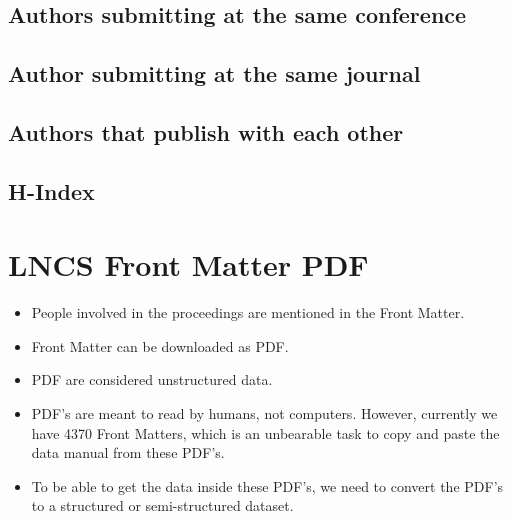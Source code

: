 \documentclass{ou-report}
\begin{document}
\section{Authors submitting at the same conference}

\section{Author submitting at the same journal}

\section{Authors that publish with each other}

\section{H-Index}


\chapter{LNCS Front Matter PDF}
\begin{itemize}
    \item People involved in the proceedings are mentioned in the Front Matter.
    \item Front Matter can be downloaded as PDF.
    \item PDF are considered unstructured data.
    \item PDF's are meant to read by humans, not computers. However, currently 
        we have 4370 Front Matters, which is an unbearable task to copy and 
        paste the data manual from these PDF's.
    \item To be able to get the data inside these PDF's, we need to convert the 
        PDF's to a structured or semi-structured dataset.
\end{itemize}
\end{document}
